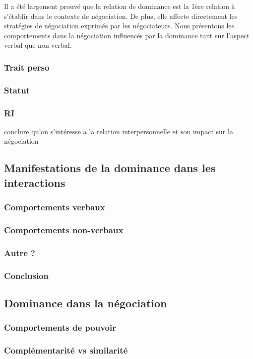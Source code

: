 \documentclass [french]{article}
\begin{document}
			Il a été largement prouvé que la relation de dominance est la 1ère relation à s'établir dans le contexte de négociation. De  plus, elle  affecte directement les stratégies de négociation exprimés par les négociateurs. Nous présentons les comportements dans la négociation influencés par la dominance tant sur l'aspect verbal que non verbal.
			\subsubsection{Trait perso}
			\subsubsection{Statut}
			\subsubsection{RI}
			
			conclure qu'on s'intéresse a la relation interpersonnelle et son impact sur la négociation 
			
			\subsection{Manifestations de la dominance dans les interactions}
				\subsubsection{Comportements verbaux}
				\subsubsection{Comportements non-verbaux}
				\subsubsection{Autre ?}
				\subsubsection{Conclusion}
				
			\subsection{Dominance dans la négociation}
			\subsubsection{Comportements de pouvoir}
			\subsubsection{Complémentarité vs similarité}
\end{document}
